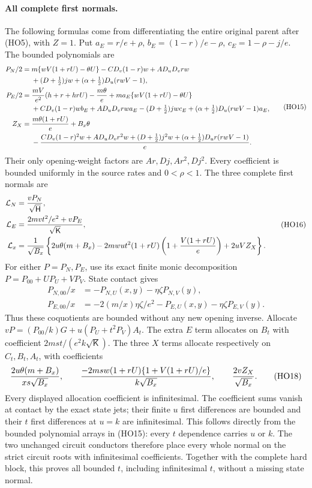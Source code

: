 \paragraph{All complete first normals.}
The following formulas come from differentiating the entire original
parent after (HO5), with $Z=1$. Put
$a_E=r/e+\rho$, $b_E=(1-r)/e-\rho$,
$c_E=1-\rho-j/e$. The bounded polynomials are
\[
 \begin{aligned}
 P_N/2={}&m\{wV(1+rU)-\theta U\}
 -CD_v(1-r)w+AD_uD_vrw\\
 &+(D+\tfrac12)jw
             +(\alpha+\tfrac12)D_u(rwV-1),\\
 P_E/2={}&{mV\over e^2}(h+r+hrU)-{m\theta\over e}
 +ma_E\{wV(1+rU)-\theta U\}\\
 &+CD_v(1-r)wb_E+AD_uD_vrwa_E
 -(D+\tfrac12)jwc_E
            +(\alpha+\tfrac12)D_u(rwV-1)a_E,\\
 Z_X={}&{m\theta(1+rU)\over e}+B_x\theta\\
 &-{CD_v(1-r)^2w+AD_uD_vr^2w+(D+\tfrac12)j^2w
                 +(\alpha+\tfrac12)D_ur(rwV-1)\over e}.
 \end{aligned}
 \tag{HO15}
\]
Their only opening-weight factors are $Ar,Dj,Ar^2,Dj^2$.
Every coefficient is bounded uniformly in the source rates and
$0<\rho<1$. The three complete first normals are
\[
 \begin{aligned}
 \mathcal L_N&={vP_N\over\sqrt{\mathsf H}},\\
 \mathcal L_E&={2mvt^2/e^2+vP_E\over\sqrt{\mathsf K}},\\
 \mathcal L_x&={1\over\sqrt{B_x}}\left\{
 2u\theta(m+B_x)-2mwut^2(1+rU)
           \left(1+{V(1+rU)\over e}\right)+2uVZ_X\right\}.
 \end{aligned}
 \tag{HO16}
\]
For either $P=P_N,P_E$, use its exact finite monic decomposition
$P=P_{00}+UP_U+VP_V$.
State contact gives
\[
 \begin{aligned}
 P_{N,00}/x&=-P_{N,U}(x,y)-\eta\zeta P_{N,V}(y),\\
 P_{E,00}/x&=-2(m/x)\eta\zeta/e^2
                         -P_{E,U}(x,y)-\eta\zeta P_{E,V}(y).
 \end{aligned}
 \tag{HO17}
\]
Thus these coquotients are bounded without any new opening inverse.
Allocate $vP=(P_{00}/k)G+u(P_U+t^2P_V)A_t$.
The extra $E$ term allocates on $B_t$ with coefficient
$2mst/(e^2k\sqrt{\mathsf K})$.
The three $X$ terms allocate respectively on $C_t,B_t,A_t$,
with coefficients
\[
 {2u\theta(m+B_x)\over xs\sqrt{B_x}},\qquad
 {-2msw(1+rU)\{1+V(1+rU)/e\}\over k\sqrt{B_x}},\qquad
 {2vZ_X\over\sqrt{B_x}} .
 \tag{HO18}
\]
Every displayed allocation coefficient is infinitesimal.
The coefficient sums vanish at contact by the exact state jets;
their finite $u$ first differences are bounded and their $t$
first differences at $u=k$ are infinitesimal.
This follows directly from the bounded polynomial arrays in
(HO15): every $t$ dependence carries $u$ or $k$.
The two unchanged circuit conductors therefore place every whole
normal on the strict circuit roots with infinitesimal coefficients.
Together with the complete hard block, this proves all bounded $t$,
including infinitesimal $t$, without a missing state normal.

